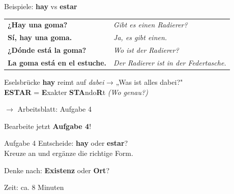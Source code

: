 \documentclass[aspectratio=169, 11pt]{beamer}
\newcommand{\es}[1]{\textbf{\textcolor{spanischrot}{#1}}}
\newcommand{\de}[1]{{\small\textcolor{dunkelgrau}{\textit{#1}}}}
\newcommand{\estar}[1]{\textbf{\textcolor{blau}{#1}}}
\begin{document}
\begin{frame}{Beispiele: \es{hay} vs \estar{estar}}

\begin{center}
\begin{tabular}{@{}p{6.5cm}p{6.5cm}@{}}
\es{¿Hay una goma?} & \de{Gibt es einen Radierer?} \\[0.5em]
\es{Sí, hay una goma.} & \de{Ja, es gibt einen.} \\[1em]
\estar{¿Dónde está la goma?} & \de{Wo ist der Radierer?} \\[0.5em]
\estar{La goma está en el estuche.} & \de{Der Radierer ist in der Federtasche.} \\
\end{tabular}
\end{center}

\vspace{0.8cm}

\begin{block}{Eselsbrücke}
\textbf{hay} reimt auf \textit{dabei} → „Was ist alles dabei?"\\
\textbf{ESTAR} = \textbf{E}xakter \textbf{STA}ndo\textbf{R}t \de{(Wo genau?)}
\end{block}

\end{frame}

\begin{frame}{$\rightarrow$ Arbeitsblatt: Aufgabe 4}

\begin{center}
{\Large Bearbeite jetzt \textbf{Aufgabe 4}!}
\end{center}

\vspace{0.8cm}

\begin{block}{Aufgabe 4}
Entscheide: \es{hay} oder \estar{estar}?\\
Kreuze an und ergänze die richtige Form.
\end{block}

\vspace{0.5cm}

\begin{center}
{\large Denke nach: \textbf{Existenz} oder \textbf{Ort}?}
\end{center}

\vspace{0.5cm}

\begin{center}
{\small\textcolor{dunkelgrau}{Zeit: ca. 8 Minuten}}
\end{center}

\end{frame}
\end{document}
